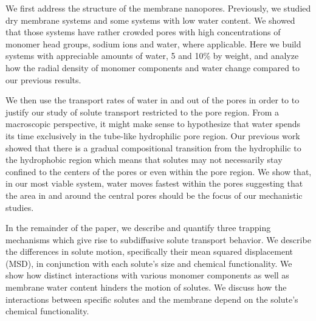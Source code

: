 \documentclass[journal=jpcbfk,manuscript=article]{achemso}
\begin{document}
  
  We first address the structure of the membrane nanopores. Previously, we
  studied dry membrane systems and some systems with low water content. We showed
  that those systems have rather crowded pores with high concentrations of monomer
  head groups, sodium ions and water, where applicable. Here we build systems with
  appreciable amounts of water, 5 and 10\% by weight, and analyze how the radial
  density of monomer components and water change compared to our previous results.

  We then use the transport rates of water in and out of the pores in order to
  to justify our study of solute transport restricted to the pore region. From a 
  macroscopic perspective, it might make sense to hypothesize that water spends its time 
  exclusively in the tube-like hydrophilic pore region. Our previous work showed
  that there is a gradual compositional transition from the hydrophilic to the
  hydrophobic region which means that solutes may not necessarily stay confined
  to the centers of the pores or even within the pore region. We show that, in 
  our most viable system, water moves fastest within the pores suggesting that 
  the 
  area in and around the central
  pores should be the focus of our mechanistic studies.
  
  

  In the remainder of the paper, we describe and quantify three trapping 
  mechanisms which give rise to subdiffusive solute transport behavior. 
  We describe the differences in solute motion, specifically their mean
  squared displacement (MSD), in conjunction with each solute's size and 
  chemical functionality. We show how distinct interactions with various
  monomer components as well as membrane water content hinders the motion 
  of solutes. We discuss how the interactions between specific solutes and
  the membrane depend on the solute's chemical functionality.
\end{document}
